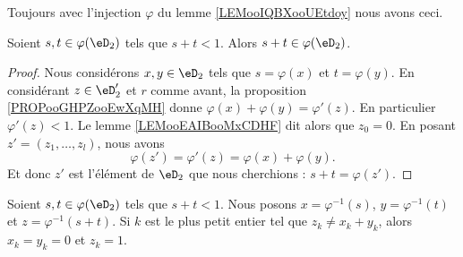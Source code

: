 Toujours avec l'injection \( \varphi\) du lemme \ref{LEMooIQBXooUEtdoy} nous avons ceci.
\begin{lemma}       \label{LEMooVDPWooWLQzbF}
	Soient \( s,t\in \varphi(\eD_2)\) tels que \( s+t<1\). Alors \( s+t\in \varphi(\eD_2)\).
\end{lemma}

\begin{proof}
	Nous considérons \( x,y\in \eD_2\) tels que \( s=\varphi(x)\) et \( t=\varphi(y)\). En considérant \( z\in \eD'_2\) et \( r\) comme avant, la proposition \ref{PROPooGHPZooEwXqMH} donne  \( \varphi(x)+\varphi(y)=\varphi'(z)\). En particulier \( \varphi'(z)<1\). Le lemme \ref{LEMooEAIBooMxCDHF} dit alors que \( z_0=0\). En posant \( z'=(z_1,\ldots,z_l)\), nous avons
	\begin{equation}
		\varphi(z')=\varphi'(z)=\varphi(x)+\varphi(y).
	\end{equation}
	Et donc \( z'\) est l'élément de \( \eD_2\) que nous cherchions : \( s+t=\varphi(z')\).
\end{proof}

\begin{lemma}       \label{LEMooQYILooMimKHS}
	Soient \( s,t\in \varphi(\eD_2)\) tels que \( s+t<1\). Nous posons \( x=\varphi^{-1}(s)\), \( y=\varphi^{-1}(t)\) et \( z=\varphi^{-1}(s+t)\). Si \(k \) est le plus petit entier tel que \( z_k\neq x_k+y_k\), alors \( x_k=y_k=0\) et \( z_k=1\).
\end{lemma}

